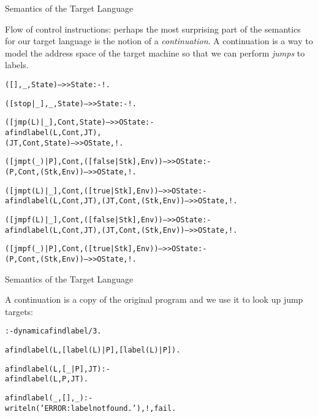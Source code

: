 \documentclass{beamer}
\begin{document}
\begin{frame}[fragile]{Semantics of the Target Language}

\scriptsize
Flow of control instructions:  perhaps the most surprising part of the semantics for our target language
is the notion of a {\em continuation}.  A continuation is a way to model the address space of the target machine
so that we can perform {\em jumps} to labels.

\tiny
\begin{alltt}
% the predicate '(+Syntax,+Continuation,+State) -->> -State' computes
% the semantic value for each syntactic structure

([],_,State) -->> State :- !.         % an empty instruction sequence is a noop

([stop|_],_,State) -->> State :- !.   % the 'stop' instruction ignores the rest of the program

([jmp(L)|_],Cont,State) -->> OState :-
    afindlabel(L,Cont,JT),
    (JT,Cont,State) -->> OState,!.

([jmpt(_)|P],Cont,([false|Stk],Env)) -->> OState :-
        (P,Cont,(Stk,Env)) -->> OState,!.
    
([jmpt(L)|_],Cont,([true|Stk],Env)) -->> OState :-
         afindlabel(L,Cont,JT),(JT,Cont,(Stk,Env)) -->> OState,!.
    
([jmpf(L)|_],Cont,([false|Stk],Env)) -->> OState :-
         afindlabel(L,Cont,JT),(JT,Cont,(Stk,Env)) -->> OState,!.

([jmpf(_)|P],Cont,([true|Stk],Env)) -->> OState :-
        (P,Cont,(Stk,Env)) -->> OState,!.
\end{alltt}

\end{frame}

\begin{frame}[fragile]{Semantics of the Target Language}

\scriptsize
A continuation is a copy of the original program and we use it to look up jump targets:

{\tiny
\begin{alltt}
% the predicate 'afindlabel(+Label,+Continuation,-JumpTarget)'
% looks up a label definition in the continutation and returns its associate code.
:- dynamic afindlabel/3.

afindlabel(L,[label(L)|P],[label(L)|P]).

afindlabel(L,[_|P],JT) :-
    afindlabel(L,P,JT).

afindlabel(_,[],_) :-
   writeln('ERROR: label not found.'),!,fail.
\end{alltt}
}
\end{frame}
\end{document}
